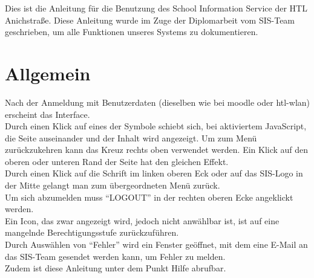 Dies ist die Anleitung für die Benutzung des School Information Service der HTL Anichstraße. Diese Anleitung wurde im Zuge der Diplomarbeit vom SIS-Team geschrieben, um alle Funktionen unseres Systems zu dokumentieren.

\section{Allgemein}
Nach der Anmeldung mit Benutzerdaten (dieselben wie bei moodle oder htl-wlan) erscheint das Interface. \\
Durch einen Klick auf eines der Symbole schiebt sich, bei aktiviertem JavaScript, die Seite auseinander und der Inhalt wird angezeigt. Um zum Menü zurückzukehren kann  das Kreuz rechts oben verwendet werden. Ein Klick auf den oberen oder unteren Rand der Seite hat den gleichen Effekt.\\
Durch einen Klick auf die Schrift im linken oberen Eck oder auf das SIS-Logo in der Mitte gelangt man zum übergeordneten Menü zurück.\\
Um sich abzumelden muss \enquote{LOGOUT} in der rechten oberen Ecke angeklickt werden.\\
Ein Icon, das zwar angezeigt wird, jedoch nicht anwählbar ist, ist auf eine mangelnde Berechtigungsstufe zurückzuführen.\\
Durch Auswählen von \enquote{Fehler} wird ein Fenster geöffnet, mit dem eine E-Mail an das SIS-Team gesendet werden kann, um Fehler zu melden.\\
Zudem ist diese Anleitung unter dem Punkt Hilfe abrufbar.